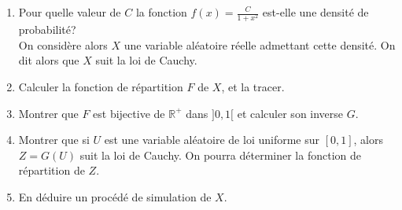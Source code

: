 \begin{exo}
\begin{enumerate}
\item
Pour quelle valeur de $C$ la fonction $f(x)=\frac{C}{1+x^2}$ est-elle une
densit{\'e} de probabilit{\'e}?
\\
On consid{\`e}re alors $X$ une variable al{\'e}atoire r{\'e}elle admettant cette densit{\'e}.
On dit alors que $X$ suit la loi de Cauchy.
\item
Calculer la fonction de r{\'e}partition $F$ de $X$, et la tracer.
\item
Montrer que $F$ est bijective de $\mathbb R^+$ dans $]0,1[$  et calculer son
inverse $G$.
\item
Montrer que si $U$ est une variable al{\'e}atoire de loi uniforme sur $[0,1]$,
alors $Z=G(U)$ suit la loi de Cauchy. On pourra d\'eterminer la fonction de r\'epartition de $Z$.
\item
En d{\'e}duire un proc{\'e}d{\'e} de
simulation de $X$.
\end{enumerate}
\end{exo}

